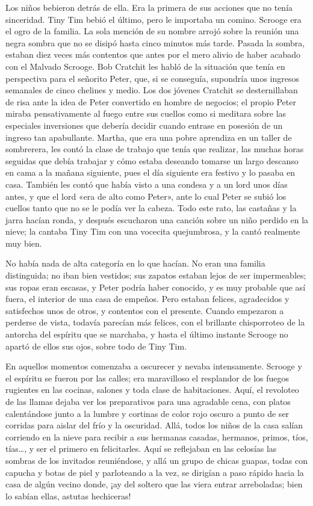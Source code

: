 \documentclass{novela}
\begin{document}
 Los niños bebieron detrás de ella. Era la primera de sus acciones que no tenía sinceridad. Tiny Tim bebió el último, pero le importaba un comino. Scrooge era el ogro de la familia. La sola mención de su nombre arrojó sobre la reunión una negra sombra que no se disipó hasta cinco minutos más tarde. Pasada la sombra, estaban diez veces más contentos que antes por el mero alivio de haber acabado con el Malvado Scrooge. Bob Cratchit les habló de la situación que tenía en perspectiva para el señorito Peter, que, si se conseguía, supondría unos ingresos semanales de cinco chelines y medio. Los dos jóvenes Cratchit se desternillaban de risa ante la idea de Peter convertido en hombre de negocios; el propio Peter miraba pensativamente al fuego entre sus cuellos como si meditara sobre las especiales inversiones que debería decidir cuando entrase en posesión de un ingreso tan apabullante. Martha, que era una pobre aprendiza en un taller de sombrerera, les contó la clase de trabajo que tenía que realizar, las muchas horas seguidas que debía trabajar y cómo estaba deseando tomarse un largo descanso en cama a la mañana siguiente, pues el día siguiente era festivo y lo pasaba en casa. También les contó que había visto a una condesa y a un lord unos días antes, y que el lord «era de alto como Peter», ante lo cual Peter se subió los cuellos tanto que no se le podía ver la cabeza. Todo este rato, las castañas y la jarra hacían ronda, y después escucharon una canción sobre un niño perdido en la nieve; la cantaba Tiny Tim con una vocecita quejumbrosa, y la cantó realmente muy bien.

 No había nada de alta categoría en lo que hacían. No eran una familia distinguida; no iban bien vestidos; sus zapatos estaban lejos de ser impermeables; sus ropas eran escasas, y Peter podría haber conocido, y es muy probable que así fuera, el interior de una casa de empeños. Pero estaban felices, agradecidos y satisfechos unos de otros, y contentos con el presente. Cuando empezaron a perderse de vista, todavía parecían más felices, con el brillante chisporroteo de la antorcha del espíritu que se marchaba, y hasta el último instante Scrooge no apartó de ellos sus ojos, sobre todo de Tiny Tim.

 En aquellos momentos comenzaba a oscurecer y nevaba intensamente. Scrooge y el espíritu se fueron por las calles; era maravilloso el resplandor de los fuegos rugientes en las cocinas, salones y toda clase de habitaciones. Aquí, el revoloteo de las llamas dejaba ver los preparativos para una agradable cena, con platos calentándose junto a la lumbre y cortinas de color rojo oscuro a punto de ser corridas para aislar del frío y la oscuridad. Allá, todos los niños de la casa salían corriendo en la nieve para recibir a sus hermanas casadas, hermanos, primos, tíos, tías{\ldots}, y ser el primero en felicitarles. Aquí se reflejaban en las celosías las sombras de los invitados reuniéndose, y allá un grupo de chicas guapas, todas con capucha y botas de piel y parloteando a la vez, se dirigían a paso rápido hacia la casa de algún vecino donde, ¡ay del soltero que las viera entrar arreboladas; bien lo sabían ellas, astutas hechiceras!
\end{document}
